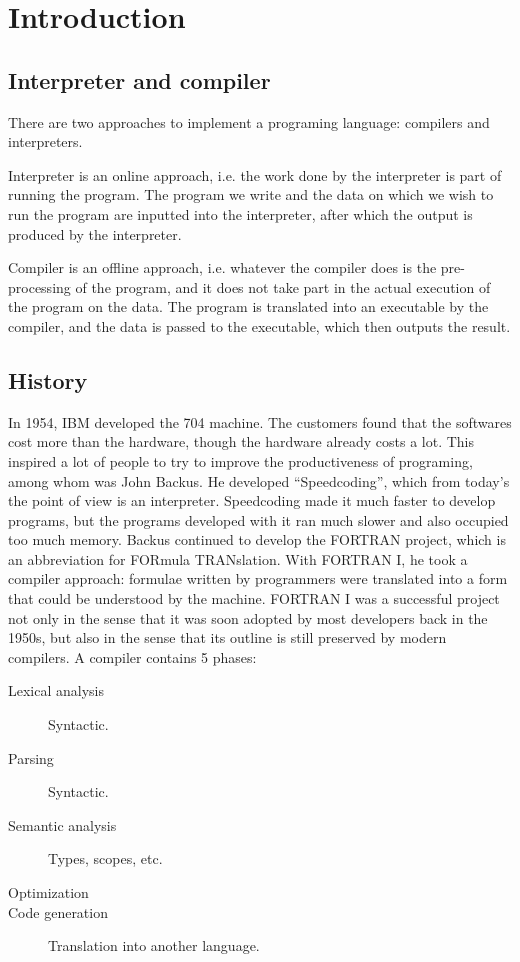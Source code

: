 \ifx\PREAMBLE\undefined


\fi
\chapter{Introduction}
\section{Interpreter and compiler}
There are two approaches to implement a programing language: compilers and interpreters.

Interpreter is an online approach, i.e. the work done by the interpreter is part of running the program. The program we write and the data on which we wish to run the program are inputted into the interpreter, after which the output is produced by the interpreter. 

Compiler is an offline approach, i.e. whatever the compiler does is the pre-processing of the program, and it does not take part in the actual execution of the program on the data. The program is translated into an executable by the compiler, and the data is passed to the executable, which then outputs the result.
\section{History}
In 1954, IBM developed the 704 machine. The customers found that the softwares cost more than the hardware, though the hardware already costs a lot. This inspired a lot of people to try to improve the productiveness of programing, among whom was John Backus. He developed ``Speedcoding'', which from today's the point of view is an interpreter. Speedcoding made it much faster to develop programs, but the programs developed with it ran much slower and also occupied too much memory. Backus continued to develop the FORTRAN project, which is an abbreviation for FORmula TRANslation. With FORTRAN I, he took a compiler approach: formulae written by programmers were translated into a form that could be understood by the machine. FORTRAN I was a successful project not only in the sense that it was soon adopted by most developers back in the 1950s, but also in the sense that its outline is still preserved by modern compilers. A compiler contains 5 phases:
\begin{description}
\item [Lexical analysis] Syntactic.
\item [Parsing] Syntactic.
\item [Semantic analysis] Types, scopes, etc.
\item [Optimization]
\item [Code generation] Translation into another language.
\end{description}
\ifx\PREAMBLE\undefined

\fi